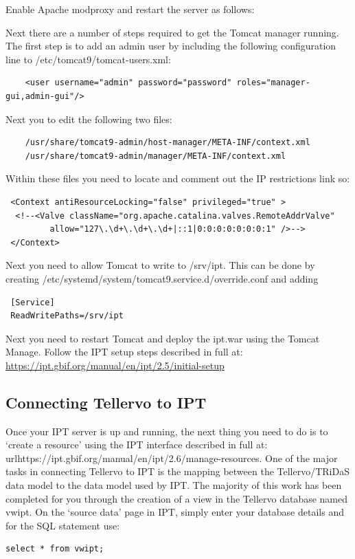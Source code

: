 Enable Apache modproxy and restart the server as follows:

Next there are a number of steps required to get the Tomcat manager running.  The first step is to add an admin user by including the following configuration line to /etc/tomcat9/tomcat-users.xml:
\begin{verbatim}
    <user username="admin" password="password" roles="manager-gui,admin-gui"/>
\end{verbatim}

Next you to edit the following two files:
\begin{verbatim}
    /usr/share/tomcat9-admin/host-manager/META-INF/context.xml
    /usr/share/tomcat9-admin/manager/META-INF/context.xml
\end{verbatim}

Within these files you need to locate and comment out the IP restrictions link so:
\begin{verbatim}
 <Context antiResourceLocking="false" privileged="true" >
  <!--<Valve className="org.apache.catalina.valves.RemoteAddrValve"
         allow="127\.\d+\.\d+\.\d+|::1|0:0:0:0:0:0:0:1" />-->
 </Context>   
\end{verbatim}

Next you need to allow Tomcat to write to /srv/ipt.  This can be done by creating /etc/systemd/system/tomcat9.service.d/override.conf and adding 
\begin{verbatim}
 [Service]
 ReadWritePaths=/srv/ipt   
\end{verbatim}

Next you need to restart Tomcat and deploy the ipt.war using the Tomcat Manage. 
 Follow the IPT setup steps described in full at: \url{https://ipt.gbif.org/manual/en/ipt/2.5/initial-setup}
 
\subsection{Connecting Tellervo to IPT}

Once your IPT server is up and running, the next thing you need to do is to `create a resource' using the IPT interface described in full at: 
url{https://ipt.gbif.org/manual/en/ipt/2.6/manage-resources}.  One of the major tasks in connecting Tellervo to IPT is the mapping between the Tellervo/TRiDaS data model to the data model used by IPT.  The majority of this work has been completed for you through the creation of a view in the Tellervo database named vwipt.  On the `source data' page in IPT, simply enter your database details and for the SQL statement use: 
\begin{verbatim}
select * from vwipt;
\end{verbatim}

